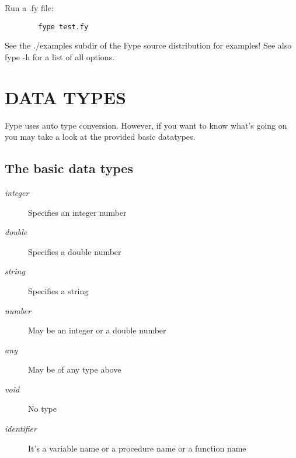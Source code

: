 Run a .fy file:

\begin{verbatim}
        fype test.fy
\end{verbatim}


See the ./examples subdir of the Fype source distribution for examples! See also fype -h for a list of all options.

\section{DATA TYPES\label{DATA_TYPES}}


Fype uses auto type conversion. However, if you want to know what's going on you may take a look at the provided basic datatypes.

\subsection*{The basic data types\label{The_basic_data_types}}
\begin{description}

\item[{\textit{integer}}] \mbox{}

Specifies an integer number


\item[{\textit{double}}] \mbox{}

Specifies a double number


\item[{\textit{string}}] \mbox{}

Specifies a string


\item[{\textit{number}}] \mbox{}

May be an integer or a double number


\item[{\textit{any}}] \mbox{}

May be of any type above


\item[{\textit{void}}] \mbox{}

No type


\item[{\textit{identifier}}] \mbox{}

It's a variable name or a procedure name or a function name

\end{description}
